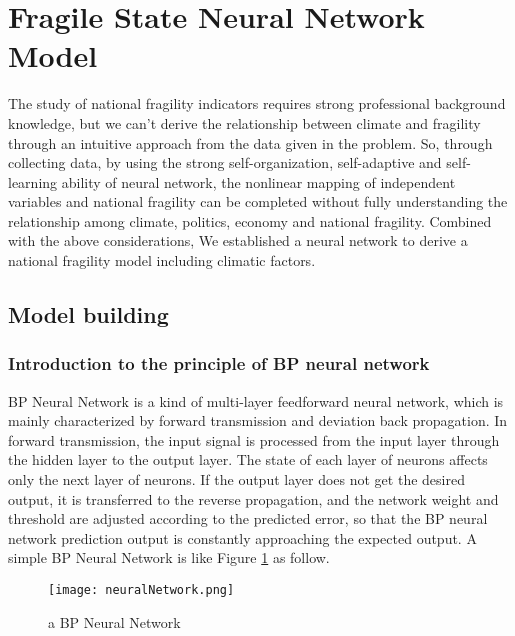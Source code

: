 \documentclass{mcmthesis}
\newcommand{\upcite}[1]{\textsuperscript{\textsuperscript{\cite{#1}}}}
\begin{document}
\section{Fragile State Neural Network Model}
The study of national fragility indicators requires strong professional
background knowledge, but we can't derive the relationship between climate
and fragility through an intuitive approach from the data given in the 
problem. So, through collecting data, by using the strong self-organization, 
self-adaptive and self-learning ability of neural network, the nonlinear 
mapping of independent variables and national fragility can be completed 
without fully understanding the relationship among climate, politics, 
economy and national fragility. Combined with the above considerations, 
We established a neural network to derive a national fragility model 
including climatic factors.
\subsection{Model building}
\subsubsection{Introduction to the principle of BP neural network}
BP Neural Network is a kind of multi-layer feedforward neural network, 
which is mainly characterized by forward transmission and deviation back 
propagation. In forward transmission, the input signal is processed from 
the input layer through the hidden layer to the output layer. The state of 
each layer of neurons affects only the next layer of neurons. If the output 
layer does not get the desired output, it is transferred to the reverse 
propagation, and the network weight and threshold are adjusted according 
to the predicted error, so that the BP neural network prediction output 
is constantly approaching the expected output. A simple BP Neural Network 
is like Figure \ref{fig:nn} as follow.\upcite{bib20}
\begin{figure}[h]
\small
\centering
\texttt{[image: neuralNetwork.png]}
\caption{a BP Neural Network} 
\label{fig:nn}
\end{figure}
\end{document}

